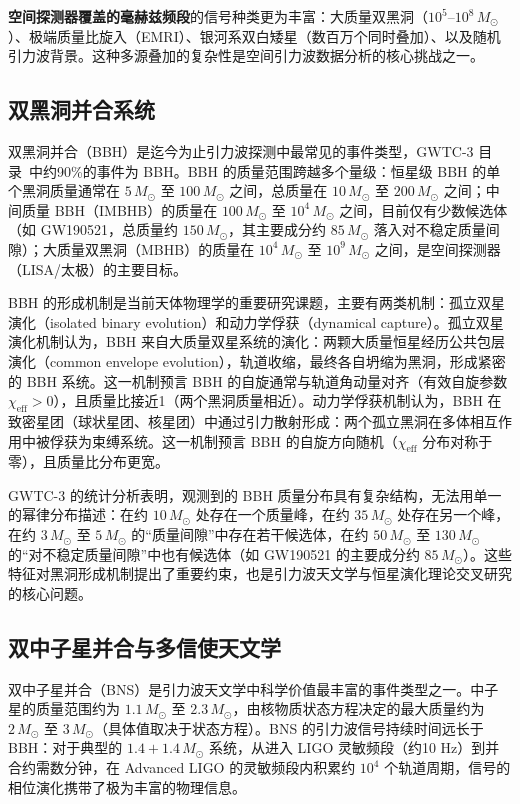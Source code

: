 \textbf{空间探测器覆盖的毫赫兹频段}的信号种类更为丰富：大质量双黑洞（$10^5$--$10^8\,M_\odot$）、极端质量比旋入（EMRI）、银河系双白矮星（数百万个同时叠加）、以及随机引力波背景。这种多源叠加的复杂性是空间引力波数据分析的核心挑战之一。

\subsection{双黑洞并合系统}

双黑洞并合（BBH）是迄今为止引力波探测中最常见的事件类型，GWTC-3 目录~\cite{Abbott2021GWTC3}中约90\%的事件为 BBH。BBH 的质量范围跨越多个量级：恒星级 BBH 的单个黑洞质量通常在 $5\,M_\odot$ 至 $100\,M_\odot$ 之间，总质量在 $10\,M_\odot$ 至 $200\,M_\odot$ 之间；中间质量 BBH（IMBHB）的质量在 $100\,M_\odot$ 至 $10^4\,M_\odot$ 之间，目前仅有少数候选体（如 GW190521，总质量约 $150\,M_\odot$，其主要成分约 $85\,M_\odot$ 落入对不稳定质量间隙）；大质量双黑洞（MBHB）的质量在 $10^4\,M_\odot$ 至 $10^9\,M_\odot$ 之间，是空间探测器（LISA/太极）的主要目标。

BBH 的形成机制是当前天体物理学的重要研究课题，主要有两类机制：孤立双星演化（isolated binary evolution）和动力学俘获（dynamical capture）。孤立双星演化机制认为，BBH 来自大质量双星系统的演化：两颗大质量恒星经历公共包层演化（common envelope evolution），轨道收缩，最终各自坍缩为黑洞，形成紧密的 BBH 系统。这一机制预言 BBH 的自旋通常与轨道角动量对齐（有效自旋参数 $\chi_\text{eff} > 0$），且质量比接近1（两个黑洞质量相近）。动力学俘获机制认为，BBH 在致密星团（球状星团、核星团）中通过引力散射形成：两个孤立黑洞在多体相互作用中被俘获为束缚系统。这一机制预言 BBH 的自旋方向随机（$\chi_\text{eff}$ 分布对称于零），且质量比分布更宽。

GWTC-3 的统计分析表明，观测到的 BBH 质量分布具有复杂结构，无法用单一的幂律分布描述：在约 $10\,M_\odot$ 处存在一个质量峰，在约 $35\,M_\odot$ 处存在另一个峰，在约 $3\,M_\odot$ 至 $5\,M_\odot$ 的“质量间隙”中存在若干候选体，在约 $50\,M_\odot$ 至 $130\,M_\odot$ 的“对不稳定质量间隙”中也有候选体（如 GW190521 的主要成分约 $85\,M_\odot$）。这些特征对黑洞形成机制提出了重要约束，也是引力波天文学与恒星演化理论交叉研究的核心问题。

\subsection{双中子星并合与多信使天文学}

双中子星并合（BNS）是引力波天文学中科学价值最丰富的事件类型之一。中子星的质量范围约为 $1.1\,M_\odot$ 至 $2.3\,M_\odot$，由核物质状态方程决定的最大质量约为 $2\,M_\odot$ 至 $3\,M_\odot$（具体值取决于状态方程）。BNS 的引力波信号持续时间远长于 BBH：对于典型的 $1.4+1.4\,M_\odot$ 系统，从进入 LIGO 灵敏频段（约10 Hz）到并合约需数分钟，在 Advanced LIGO 的灵敏频段内积累约 $10^4$ 个轨道周期，信号的相位演化携带了极为丰富的物理信息。

